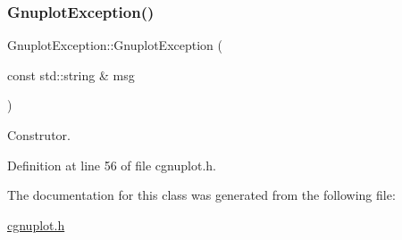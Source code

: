 \subsubsection{\texorpdfstring{Gnuplot\+Exception()}{GnuplotException()}}
{\footnotesize\ttfamily Gnuplot\+Exception\+::\+Gnuplot\+Exception (\begin{DoxyParamCaption}\item[{const std\+::string \&}]{msg }\end{DoxyParamCaption})\hspace{0.3cm}{\ttfamily [inline]}}



Construtor. 



Definition at line 56 of file cgnuplot.\+h.



The documentation for this class was generated from the following file\+:\begin{DoxyCompactItemize}
\item 
\hyperlink{cgnuplot_8h}{cgnuplot.\+h}\end{DoxyCompactItemize}
